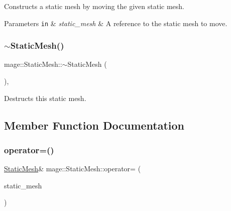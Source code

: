 Constructs a static mesh by moving the given static mesh.


\begin{DoxyParams}[1]{Parameters}
\mbox{\tt in}  & {\em static\+\_\+mesh} & A reference to the static mesh to move. \\
\hline
\end{DoxyParams}
\hypertarget{classmage_1_1_static_mesh_a7fbae949f631d29913193a1b2c2ef658}{}\label{classmage_1_1_static_mesh_a7fbae949f631d29913193a1b2c2ef658} 
\subsubsection{\texorpdfstring{$\sim$\+Static\+Mesh()}{~StaticMesh()}}
{\footnotesize\ttfamily mage\+::\+Static\+Mesh\+::$\sim$\+Static\+Mesh (\begin{DoxyParamCaption}{ }\end{DoxyParamCaption})\hspace{0.3cm}{\ttfamily [virtual]}, {\ttfamily [default]}}

Destructs this static mesh. 

\subsection{Member Function Documentation}
\hypertarget{classmage_1_1_static_mesh_af73dd102f2de9cf7529e380895cfc8ff}{}\label{classmage_1_1_static_mesh_af73dd102f2de9cf7529e380895cfc8ff} 
\subsubsection{\texorpdfstring{operator=()}{operator=()}\hspace{0.1cm}{\footnotesize\ttfamily [1/2]}}
{\footnotesize\ttfamily \hyperlink{classmage_1_1_static_mesh}{Static\+Mesh}\& mage\+::\+Static\+Mesh\+::operator= (\begin{DoxyParamCaption}\item[{const \hyperlink{classmage_1_1_static_mesh}{Static\+Mesh} \&}]{static\+\_\+mesh }\end{DoxyParamCaption})\hspace{0.3cm}{\ttfamily [delete]}}

